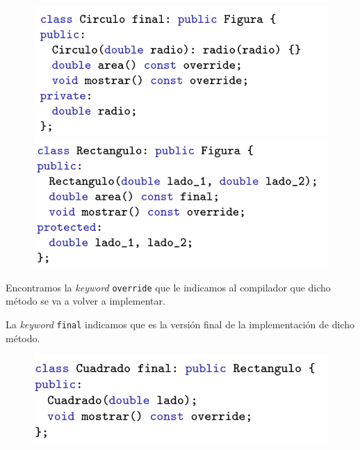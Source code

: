 \begin{figure}[h]
	\begin{minipage}{0.5\textwidth}
		\includegraphics[width=\textwidth]{Imagenes/poli6.png}
	\end{minipage}
	\hfill
	\begin{minipage}{0.5\textwidth}
		\includegraphics[width=\textwidth]{Imagenes/poli7.png}
	\end{minipage}
\end{figure}

Encontramos la \textit{keyword} \texttt{override} que le indicamos al compilador que dicho método se va a volver a implementar.

La \textit{keyword} \texttt{final} indicamos que es la versión final de la implementación de dicho método.
\newpage

\begin{figure}[h]
	\begin{center}
		\includegraphics[width=\textwidth]{Imagenes/poli8.png}
	\end{center}
\end{figure}

